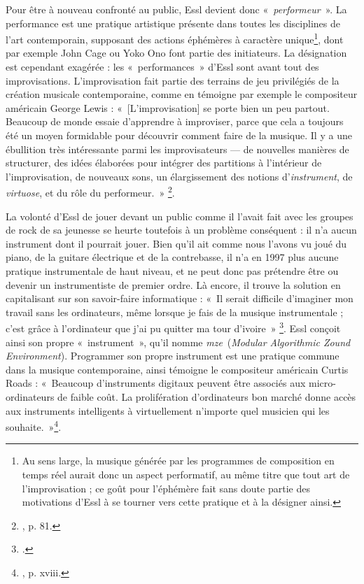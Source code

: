 \documentclass[a4paper,12pt]{article}
\newcommand{\guill}[1]{«~#1~»}
\newcommand{\maze}[0]{\emph{m\symbol{64}ze\textdegree2}}
\begin{document}
Pour être à nouveau confronté au public, Essl devient donc \guill{\emph{performeur}}. La performance est une pratique artistique présente dans toutes les disciplines de l'art contemporain, supposant des actions éphémères à caractère unique\footnote{Au sens large, la musique générée par les programmes de composition en temps réel aurait donc un aspect performatif, au même titre que tout art de l'improvisation ; ce goût pour l'éphémère fait sans doute partie des motivations d'Essl à se tourner vers cette pratique et à la désigner ainsi.}, dont par exemple John Cage ou Yoko Ono font partie des initiateurs. La désignation est cependant exagérée : les \guill{performances} d'Essl sont avant tout des improvisations. L'improvisation fait partie des terrains de jeu privilégiés de la création musicale contemporaine, comme en témoigne par exemple le compositeur américain George Lewis : \guill{[L'improvisation] se porte bien un peu partout. Beaucoup de monde essaie d'apprendre à improviser, parce que cela a toujours été un moyen formidable pour découvrir comment faire de la musique. Il y a une ébullition très intéressante parmi les improvisateurs --- de nouvelles manières de structurer, des idées élaborées pour intégrer des partitions à l'intérieur de l'improvisation, de nouveaux sons, un élargissement des notions d'\emph{instrument}, de \emph{virtuose}, et du rôle du performeur.}
\footnote{\cite{appleton1986composers}, p. 81.}.

La volonté d'Essl de jouer devant un public comme il l'avait fait avec les groupes de rock de sa jeunesse se heurte toutefois à un problème conséquent : il n'a aucun instrument dont il pourrait jouer. Bien qu'il ait comme nous l'avons vu joué du piano, de la guitare électrique et de la contrebasse, il n'a en 1997 plus aucune pratique instrumentale de haut niveau, et ne peut donc pas prétendre être ou devenir un instrumentiste de premier ordre. Là encore, il trouve la solution en capitalisant sur son savoir-faire informatique : \guill{Il serait difficile d'imaginer mon travail sans les ordinateurs, même lorsque je fais de la musique instrumentale ; c'est grâce à l'ordinateur que j'ai pu quitter ma tour d'ivoire}
\footnote{\cite{pagano}.}. Essl conçoit ainsi son propre \guill{instrument}, qu'il nomme \maze~(\emph{Modular Algorithmic Zound Environment}). Programmer son propre instrument est une pratique commune dans la musique contemporaine, ainsi témoigne le compositeur américain Curtis Roads : \guill{Beaucoup d'instruments digitaux peuvent être associés aux micro-ordinateurs de faible coût. La prolifération d'ordinateurs bon marché donne accès aux instruments intelligents à virtuellement n'importe quel musicien qui les souhaite.}\footnote{\cite{appleton1986composers}, p. xviii.}.
\end{document}
